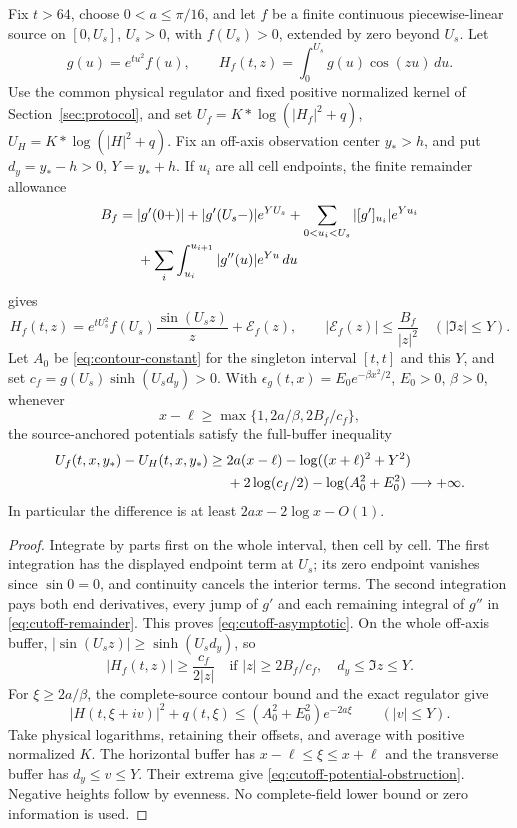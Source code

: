 \begin{proposition}
\label{prop:cutoff-potential}
Fix $t>64$, choose $0<a\le\pi/16$, and let $f$ be a finite
continuous piecewise-linear source on
$[0,U_s]$, $U_s>0$, with $f(U_s)>0$, extended by zero beyond $U_s$.
Let
\[
 g(u)=e^{tu^2}f(u),\qquad
 H_f(t,z)=\int_0^{U_s}g(u)\cos(zu)\,du.
\]
Use the common physical regulator and fixed positive normalized kernel
of Section~\ref{sec:protocol}, and set
$U_f=K*\log(|H_f|^2+q)$, $U_H=K*\log(|H|^2+q)$.
Fix an off-axis observation center
$y_*>h$, and put $d_y=y_*-h>0$, $Y=y_*+h$. If $u_i$ are all cell
endpoints, the finite remainder allowance
\begin{align}
 B_f={}&|g'(0+)|+|g'(U_s-)|e^{YU_s}
       +\sum_{0<u_i<U_s}|[g']_{u_i}|e^{Yu_i}\notag\\
 &+\sum_i\int_{u_i}^{u_{i+1}}|g''(u)|e^{Yu}\,du
 \label{eq:cutoff-remainder}
\end{align}
gives
\begin{equation}
 H_f(t,z)=e^{tU_s^2}f(U_s)\frac{\sin(U_sz)}z+\mathcal E_f(z),
 \qquad |\mathcal E_f(z)|\le\frac{B_f}{|z|^2}
 \quad(|\Im z|\le Y).
 \label{eq:cutoff-asymptotic}
\end{equation}
Let $A_0$ be \eqref{eq:contour-constant} for the singleton interval
$[t,t]$ and this $Y$, and set $c_f=g(U_s)\sinh(U_sd_y)>0$.
With $\epsilon_g(t,x)=E_0e^{-\beta x^2/2}$,
$E_0>0$, $\beta>0$, whenever
\[
 x-\ell\ge\max\{1,2a/\beta,2B_f/c_f\},
\]
the source-anchored potentials satisfy the full-buffer inequality
\begin{align}
 U_f(t,x,y_*)-U_H(t,x,y_*)\ge{}&2a(x-\ell)
      -\log((x+\ell)^2+Y^2)\notag\\
 &+2\log(c_f/2)-\log(A_0^2+E_0^2)
 \longrightarrow+\infty.
 \label{eq:cutoff-potential-obstruction}
\end{align}
In particular the difference is at least $2ax-2\log x-O(1)$.
\end{proposition}
\begin{proof}
Integrate by parts first on the whole interval, then cell by cell.
The first integration has the displayed endpoint term at $U_s$; its
zero endpoint vanishes since $\sin0=0$, and continuity cancels the
interior terms. The second integration pays both end derivatives,
every jump of $g'$ and each remaining integral of $g''$ in
\eqref{eq:cutoff-remainder}. This proves
\eqref{eq:cutoff-asymptotic}. On the whole off-axis buffer,
$|\sin(U_sz)|\ge\sinh(U_sd_y)$, so
\[
 |H_f(t,z)|\ge\frac{c_f}{2|z|}
 \quad\text{if }|z|\ge2B_f/c_f,\quad d_y\le\Im z\le Y.
\]
For $\xi\ge2a/\beta$, the complete-source contour bound and the exact
regulator give
\[
 |H(t,\xi+iv)|^2+q(t,\xi)
 \le(A_0^2+E_0^2)e^{-2a\xi}\qquad(|v|\le Y).
\]
Take physical logarithms, retaining their offsets, and average with
positive normalized $K$. The horizontal buffer has
$x-\ell\le\xi\le x+\ell$ and the transverse buffer has
$d_y\le v\le Y$. Their extrema give
\eqref{eq:cutoff-potential-obstruction}. Negative heights follow by
evenness. No complete-field lower bound or zero information is used.
\end{proof}

